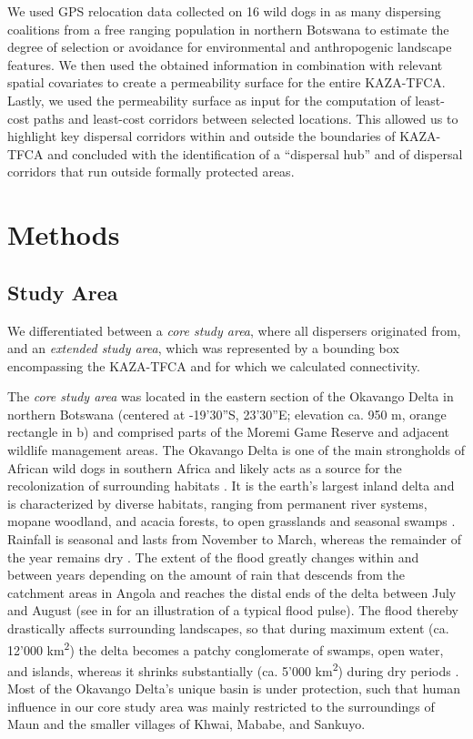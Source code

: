 \documentclass[abstract=on,10pt,a4paper,bibliography=totocnumbered]{scrartcl}
\begin{document}
We used GPS relocation data collected on 16 wild dogs in as many dispersing
coalitions from a free ranging population in northern Botswana to estimate the
degree of selection or avoidance for environmental and anthropogenic landscape
features. We then used the obtained information in combination with relevant
spatial covariates to create a permeability surface for the entire KAZA-TFCA.
Lastly, we used the permeability surface as input for the computation of
least-cost paths and least-cost corridors between selected locations. This
allowed us to highlight key dispersal corridors within and outside the
boundaries of KAZA-TFCA and concluded with the identification of a ``dispersal
hub'' and of dispersal corridors that run outside formally protected areas.

\newpage
\section{Methods}
\subsection{Study Area}
We differentiated between a \textit{core study area}, where all dispersers
originated from, and an \textit{extended study area}, which was represented by a
bounding box encompassing the KAZA-TFCA \citep{Cozzi.2020} and for which we
calculated connectivity.

The \textit{core study area} was located in the eastern section of the Okavango
Delta in northern Botswana (centered at -19'30''S, 23'30''E;
elevation ca. 950 m, orange rectangle in b) and comprised parts
of the Moremi Game Reserve and adjacent wildlife management areas. The Okavango
Delta is one of the main strongholds of African wild dogs in southern Africa and
likely acts as a source for the recolonization of surrounding habitats
\citep{Woodroffe.2012, Cozzi.2013}. It is the earth's largest inland delta and
is characterized by diverse habitats, ranging from permanent river systems,
mopane woodland, and acacia forests, to open grasslands and seasonal swamps
\citep{Broekhuis.2013}. Rainfall is seasonal and lasts from November to March,
whereas the remainder of the year remains dry \citep{McNutt.1996}. The extent of
the flood greatly changes within and between years depending on the amount of
rain that descends from the catchment areas in Angola and reaches the distal
ends of the delta between July and August (see  in
 for an illustration of a typical flood
pulse). The flood thereby drastically affects surrounding landscapes, so that
during maximum extent (ca. 12'000 km\textsuperscript{2}) the delta becomes a
patchy conglomerate of swamps, open water, and islands, whereas it shrinks
substantially (ca. 5'000 km\textsuperscript{2}) during dry periods
\citep{Gumbricht.2004, Wolski.2017}. Most of the Okavango Delta's unique basin
is under protection, such that human influence in our core study area was mainly
restricted to the surroundings of Maun and the smaller villages of Khwai,
Mababe, and Sankuyo.
\end{document}
